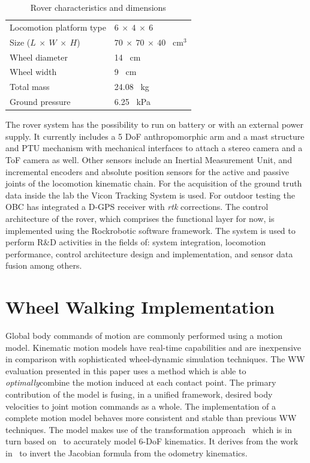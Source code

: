 \documentclass[a4paper,twocolumn]{esapub2005} %
\begin{document}
\begin{table}[h]
	\begin{tabular}{ll}
	Locomotion platform type       & $6~\times~4~\times~6$             \\
	Size ($L~\times~W~\times~H$)   & $70~\times~70~\times~40$ ~\unit{cm$^3$} \\
	Wheel diameter                 & 14 ~\unit{cm}    \\
	Wheel width                    & 9 ~\unit{cm}     \\
	Total mass                     & 24.08 ~\unit{kg} \\
	Ground pressure                & 6.25 ~\unit{kPa}        
	\end{tabular}
	\caption{Rover characteristics and dimensions}
	\label{tab:ExoterDimensionsTable}
\end{table}

The rover system has the possibility to run on battery or with an external power supply. It currently includes a 5 DoF anthropomorphic arm and a mast
structure and PTU mechanism with mechanical interfaces to attach a stereo
camera and a ToF camera as well. Other sensors include an Inertial Measurement
Unit, and incremental encoders and absolute position sensors for the active and
passive joints of the locomotion kinematic chain. For the acquisition of the
ground truth data inside the lab the Vicon Tracking System is used. For outdoor
testing the OBC has integrated a D-GPS receiver with \textit{rtk} corrections.
The control architecture of the rover, which comprises the functional layer for
now, is implemented using the Rock\footnotemark[1] robotic software framework. The
system is used to perform R\&D activities in the fields of: system integration,
locomotion performance, control architecture design and implementation, and
sensor data fusion among others. 


\section{Wheel Walking Implementation}

Global body commands of motion are commonly performed using a motion model.
Kinematic motion models have real-time capabilities and are inexpensive in
comparison with sophisticated wheel-dynamic simulation techniques.  The
WW evaluation presented in this paper uses a method which is able to
\textit{optimally}\footnotemark[2] combine the motion induced at each contact
point. The primary contribution of the model is fusing, in a unified framework,
desired body velocities to joint motion commands as a whole.  The
implementation of a complete motion model behaves more consistent and stable
than previous WW techniques. The model makes use of the
transformation approach~\cite{Tarokh2005} which is in turn based 
on~\cite{MuirNeumann1987} to accurately model 6-DoF kinematics.
It derives from the work in~\cite{Hidalgo-Carrio2014} to invert the Jacobian
formula from the odometry kinematics.
\end{document}
